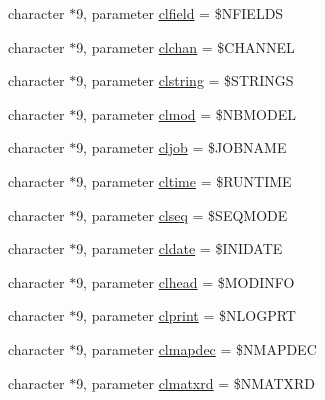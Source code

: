 \begin{DoxyCompactItemize}
\item 
character $\ast$9, parameter \hyperlink{namespacemod__oasis__namcouple_a1c3afcba25a8ba41738104d42a59e423}{clfield} = \textquotesingle{}\$N\+F\+I\+E\+L\+DS \textquotesingle{}
\item 
character $\ast$9, parameter \hyperlink{namespacemod__oasis__namcouple_ac0ead9ca992504e9b580db2678926b68}{clchan} = \textquotesingle{}\$C\+H\+A\+N\+N\+EL \textquotesingle{}
\item 
character $\ast$9, parameter \hyperlink{namespacemod__oasis__namcouple_a4dde076bf8cce410eebbd878f791e32e}{clstring} = \textquotesingle{}\$S\+T\+R\+I\+N\+GS \textquotesingle{}
\item 
character $\ast$9, parameter \hyperlink{namespacemod__oasis__namcouple_aa5cc4d0530b3e755441ef9ef70d8083b}{clmod} = \textquotesingle{}\$N\+B\+M\+O\+D\+EL \textquotesingle{}
\item 
character $\ast$9, parameter \hyperlink{namespacemod__oasis__namcouple_afbdcab2dcd637c9c70db27c8c46bd2d7}{cljob} = \textquotesingle{}\$J\+O\+B\+N\+A\+ME \textquotesingle{}
\item 
character $\ast$9, parameter \hyperlink{namespacemod__oasis__namcouple_a21a2ef5048e9fc9551821e8a0b8dec0b}{cltime} = \textquotesingle{}\$R\+U\+N\+T\+I\+ME \textquotesingle{}
\item 
character $\ast$9, parameter \hyperlink{namespacemod__oasis__namcouple_a0d0b7fa2be2a8202344c0ef9085c1309}{clseq} = \textquotesingle{}\$S\+E\+Q\+M\+O\+DE \textquotesingle{}
\item 
character $\ast$9, parameter \hyperlink{namespacemod__oasis__namcouple_a0f2d8d935f9088aec74c4dda3e9f5d9c}{cldate} = \textquotesingle{}\$I\+N\+I\+D\+A\+TE \textquotesingle{}
\item 
character $\ast$9, parameter \hyperlink{namespacemod__oasis__namcouple_a15338be5483b1b392e3e5580be75704d}{clhead} = \textquotesingle{}\$M\+O\+D\+I\+N\+FO \textquotesingle{}
\item 
character $\ast$9, parameter \hyperlink{namespacemod__oasis__namcouple_aeaab03598b6067fbecd8d8fc0c54443e}{clprint} = \textquotesingle{}\$N\+L\+O\+G\+P\+RT \textquotesingle{}
\item 
character $\ast$9, parameter \hyperlink{namespacemod__oasis__namcouple_acb6d787969090bd3c10b20775abf6531}{clmapdec} = \textquotesingle{}\$N\+M\+A\+P\+D\+EC \textquotesingle{}
\item 
character $\ast$9, parameter \hyperlink{namespacemod__oasis__namcouple_ab529642a54ad832b85c11fe4bd843314}{clmatxrd} = \textquotesingle{}\$N\+M\+A\+T\+X\+RD \textquotesingle{}

\end{DoxyCompactItemize}
